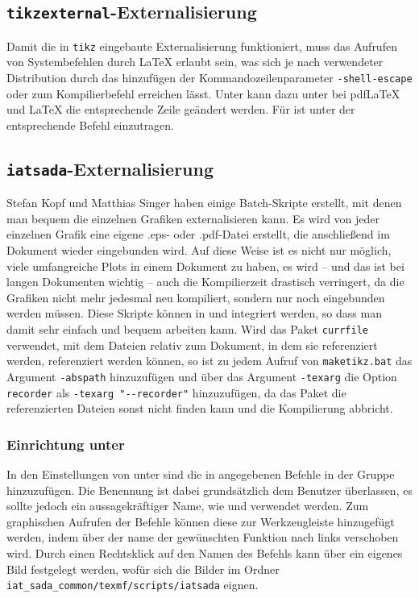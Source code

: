 \subsection{\texttt{tikzexternal}-Externalisierung}
Damit die in \texttt{tikz} eingebaute Externalisierung funktioniert, muss das Aufrufen von Systembefehlen durch \LaTeX{} erlaubt sein, was sich je nach verwendeter Distribution durch das hinzufügen der Kommandozeilenparameter \zitat\texttt{{-shell-escape}} oder  zum Kompilierbefehl erreichen lässt.
Unter \Texstudio{} kann dazu unter  bei pdf\LaTeX{} und \LaTeX{} die entsprechende Zeile geändert werden.
Für \Texniccenter{} ist unter  der entsprechende Befehl einzutragen.

\subsection{\texttt{iatsada}-Externalisierung}
Stefan Kopf und Matthias Singer haben einige Batch-Skripte erstellt, mit denen man bequem die einzelnen Grafiken externalisieren kann.
Es wird von jeder einzelnen Grafik eine eigene .eps- oder .pdf-Datei erstellt, die anschließend im Dokument wieder eingebunden wird.
Auf diese Weise ist es nicht nur möglich, viele umfangreiche Plots in einem Dokument zu haben, es wird – und das ist bei langen Dokumenten wichtig – auch die Kompilierzeit drastisch verringert, da die Grafiken nicht mehr jedesmal neu kompiliert, sondern nur noch eingebunden werden müssen.
Diese Skripte können in \Texstudio{} und \Texniccenter{} integriert werden, so dass man damit sehr einfach und bequem arbeiten kann.
Wird das Paket \texttt{currfile} verwendet, mit dem Dateien relativ zum Dokument, in dem sie referenziert werden, referenziert werden können, so ist zu jedem Aufruf von \texttt{maketikz.bat} das Argument \texttt{-abspath} hinzuzufügen und über das Argument \texttt{-texarg} die Option \texttt{recorder} als \texttt{-texarg "{}-{}-recorder"{}} hinzuzufügen, da das Paket die referenzierten Dateien sonst nicht finden kann und die Kompilierung abbricht.

\subsubsection{Einrichtung unter \Texstudio}
\label{sec:External:Texstudio}
In den Einstellungen von \Texstudio{} unter  sind die in  angegebenen Befehle in der Gruppe  hinzuzufügen.
Die Benennung ist dabei grundsätzlich dem Benutzer überlassen, es sollte jedoch ein aussagekräftiger Name, wie \zB {} und  verwendet werden.
Zum graphischen Aufrufen der Befehle können diese zur Werkzeugleiste hinzugefügt werden, indem über  der name der gewünschten Funktion nach links verschoben wird.
Durch einen Rechtsklick auf den Namen des Befehls kann über  ein eigenes Bild festgelegt werden, wofür sich \bspw die Bilder im Ordner \verb|iat_sada_common/texmf/scripts/iatsada| eignen.

